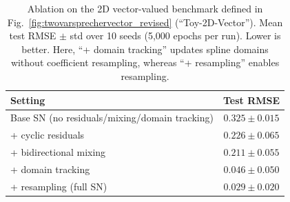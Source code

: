\documentclass{article}
\theoremstyle{plain}
\theoremstyle{definition}
\theoremstyle{remark}
\begin{document}
\begin{table}[t]
\centering
\caption{Ablation on the 2D vector-valued benchmark defined in Fig.~\ref{fig:twovarsprechervector_revised} (``Toy-2D-Vector''). Mean test RMSE $\pm$ std over 10 seeds (5{,}000 epochs per run). Lower is better. Here, ``+ domain tracking'' updates spline domains without coefficient resampling, whereas ``+ resampling'' enables resampling.}

\label{tab:toy2d_addons_ablation}
\small
\begin{tabular}{lc}
\toprule
Setting & Test RMSE \\
\midrule
Base SN (no residuals/mixing/domain tracking) & $0.325 \pm 0.015$ \\
+ cyclic residuals & $0.226 \pm 0.065$ \\
+ bidirectional mixing & $0.211 \pm 0.055$ \\
+ domain tracking & $0.046 \pm 0.050$ \\
+ resampling (full SN) & $\mathbf{0.029 \pm 0.020}$ \\
\bottomrule
\end{tabular}
\end{table}
\end{document}
